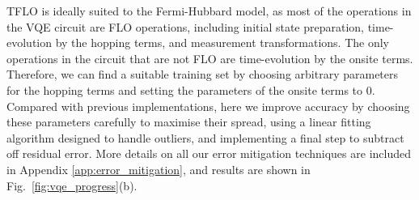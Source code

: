 \documentclass[aps,prb,twoside,superscriptaddress,longbibliography,nofootinbib,floatfix, notitlepage,twocolumn]{revtex4-1}
\begin{document}
TFLO is ideally suited to the Fermi-Hubbard model, as most of the operations in the VQE circuit are FLO operations, including initial state preparation, time-evolution by the hopping terms, and measurement transformations. The only operations in the circuit that are not FLO are time-evolution by the onsite terms. Therefore, we can find a suitable training set by choosing arbitrary parameters for the hopping terms and setting the parameters of the onsite terms to 0. 
Compared with previous implementations\cite{montanaro21}, here we improve accuracy by choosing these parameters carefully to maximise their spread, using a linear fitting algorithm designed to handle outliers\cite{theil50,sen68}, and implementing a final step to subtract off residual error.
More details on all our error mitigation techniques are included in Appendix \ref{app:error_mitigation}, and results are shown in Fig.~\ref{fig:vqe_progress}(b).
\end{document}
